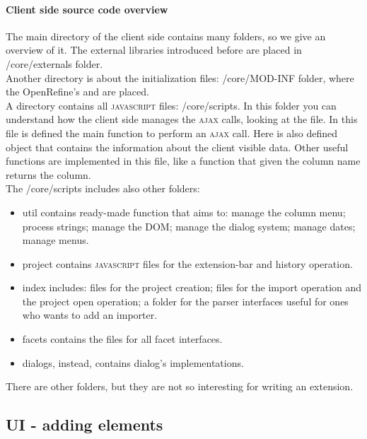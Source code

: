\paragraph{Client side source code overview} The main directory of the client side contains many folders, so we give an overview of it. The external libraries introduced before are placed in \textsf{/core/externals} folder.\\ 
Another directory is about the initialization files: \textsf{/core/MOD-INF} folder, where the OpenRefine's  and  are placed.
\\ A directory contains all \textsc{javascript} files: \textsf{/core/scripts}. In this folder you can understand how the client side manages the \textsc{ajax} calls, looking at the  file. In this file is defined the main function to perform an \textsc{ajax} call. Here is also defined  object that contains the information about the client visible data. Other useful functions are implemented in this file, like a function that given the column name returns the column. \\
The \textsf{/core/scripts} includes also other folders:
\begin{itemize}
 \item \textsf{util} contains ready-made function that aims to: manage the column menu; process strings; manage the DOM; manage the dialog system; manage dates; manage menus.
 \item \textsf{project} contains \textsc{javascript} files for the extension-bar and history operation. 
 \item \textsf{index} includes: files for the project creation; files for the import operation and the project open operation; a folder for the parser interfaces useful for ones who wants to add an importer.
 \item \textsf{facets} contains the files for all facet interfaces. 
 \item \textsf{dialogs}, instead, contains dialog's implementations. 
\end{itemize}
There are other folders, but they are not so interesting for writing an extension.

\subsection{UI - adding elements}
